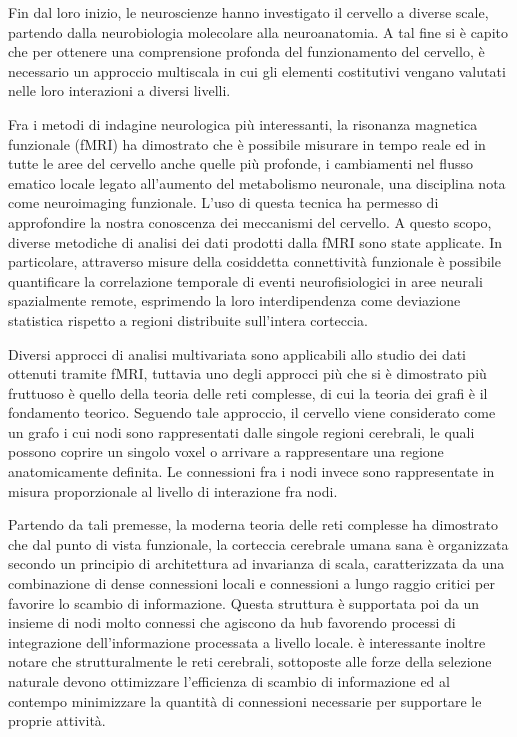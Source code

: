Fin dal loro inizio, le neuroscienze hanno investigato il cervello a diverse scale, partendo dalla neurobiologia molecolare alla neuroanatomia.
A tal fine si è capito che per ottenere una comprensione profonda del funzionamento del cervello, è necessario un approccio multiscala in cui gli elementi costitutivi vengano valutati nelle loro interazioni a diversi livelli.

Fra i metodi di indagine neurologica più interessanti, la risonanza magnetica funzionale (fMRI) ha dimostrato che è possibile misurare in tempo reale ed in tutte le aree del cervello anche quelle più profonde, i cambiamenti nel flusso ematico locale legato all'aumento del metabolismo neuronale, una disciplina nota come neuroimaging funzionale.
L'uso di questa tecnica ha permesso di approfondire la nostra conoscenza dei meccanismi del cervello.
A questo scopo, diverse metodiche di analisi dei dati prodotti dalla fMRI sono state applicate.
In particolare, attraverso misure della cosiddetta connettività funzionale è possibile quantificare la correlazione temporale di eventi neurofisiologici in aree neurali spazialmente remote, esprimendo la loro interdipendenza come deviazione statistica rispetto a regioni distribuite sull'intera corteccia.

Diversi approcci di analisi multivariata sono applicabili allo studio dei dati ottenuti tramite fMRI, tuttavia uno degli approcci più che si è dimostrato più fruttuoso è quello della teoria delle reti complesse, di cui la teoria dei grafi è il fondamento teorico.
Seguendo tale approccio, il cervello viene considerato come un grafo i cui nodi sono rappresentati dalle singole regioni cerebrali, le quali possono coprire un singolo voxel o arrivare a rappresentare una regione anatomicamente definita.
Le connessioni fra i nodi invece sono rappresentate in misura proporzionale al livello di interazione fra nodi.

Partendo da tali premesse, la moderna teoria delle reti complesse ha dimostrato che dal punto di vista funzionale, la corteccia cerebrale umana sana 
è organizzata secondo un principio di architettura ad invarianza di scala, caratterizzata da una combinazione di dense connessioni locali e connessioni a lungo raggio critici per favorire lo scambio di informazione. Questa struttura è supportata poi da un insieme di nodi molto connessi che agiscono da hub favorendo processi di integrazione dell'informazione processata a livello locale.
è interessante inoltre notare che strutturalmente le reti cerebrali, sottoposte alle forze della selezione naturale devono ottimizzare l'efficienza di scambio di informazione ed al contempo minimizzare la quantità di connessioni necessarie per supportare le proprie attività.

